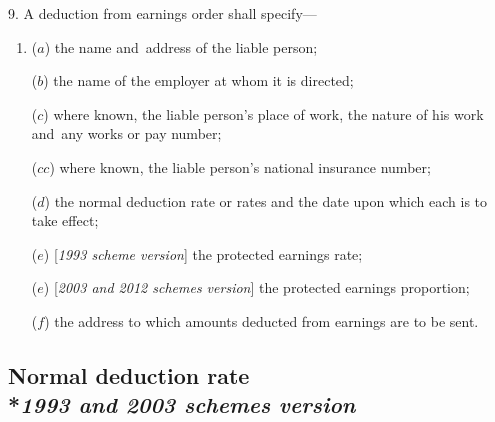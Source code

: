 \documentclass[12pt,a4paper]{article}
\begin{document}
9.  A deduction from earnings order shall specify—
\begin{enumerate}\item[]
($a$) the name and~address of the liable person;

($b$) the name of the employer at whom it is directed;

($c$) where known, the liable person’s place of work, the nature of his work and~any works or pay number;

($cc$) where known, the liable person’s national insurance number;

%

($d$) the normal deduction rate or rates and the date upon which each is to take effect;

($e$) [\emph{1993 scheme version}] the protected earnings rate;

($e$) [\emph{2003 and 2012 schemes version}] the 
protected earnings proportion;  %

($f$) the address to which amounts deducted from earnings are to be sent.
\end{enumerate}


\subsection[10. Normal deduction rate --- \emph{1993 and 2003 schemes version}]{Normal deduction rate\\*\emph{1993 and 2003 schemes version}}
\end{document}
